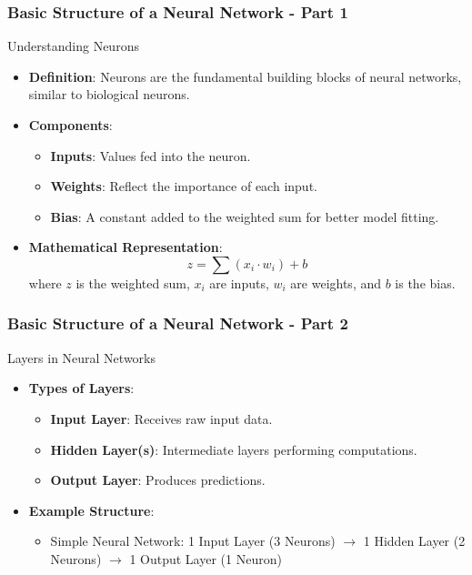 \documentclass[aspectratio=169]{beamer}
\begin{document}
\begin{frame}[fragile]
    \frametitle{Basic Structure of a Neural Network - Part 1}
    \begin{block}{Understanding Neurons}
        \begin{itemize}
            \item \textbf{Definition}: Neurons are the fundamental building blocks of neural networks, similar to biological neurons.
            \item \textbf{Components}:
                \begin{itemize}
                    \item \textbf{Inputs}: Values fed into the neuron.
                    \item \textbf{Weights}: Reflect the importance of each input.
                    \item \textbf{Bias}: A constant added to the weighted sum for better model fitting.
                \end{itemize}
            \item \textbf{Mathematical Representation}:
                \begin{equation}
                    z = \sum (x_i \cdot w_i) + b
                \end{equation}
                where \( z \) is the weighted sum, \( x_i \) are inputs, \( w_i \) are weights, and \( b \) is the bias.
        \end{itemize}
    \end{block}
\end{frame}

\begin{frame}[fragile]
    \frametitle{Basic Structure of a Neural Network - Part 2}
    \begin{block}{Layers in Neural Networks}
        \begin{itemize}
            \item \textbf{Types of Layers}:
                \begin{itemize}
                    \item \textbf{Input Layer}: Receives raw input data.
                    \item \textbf{Hidden Layer(s)}: Intermediate layers performing computations.
                    \item \textbf{Output Layer}: Produces predictions.
                \end{itemize}
            \item \textbf{Example Structure}:
                \begin{itemize}
                    \item Simple Neural Network: 
                    1 Input Layer (3 Neurons) $\rightarrow$ 1 Hidden Layer (2 Neurons) $\rightarrow$ 1 Output Layer (1 Neuron)
                \end{itemize}
        \end{itemize}
    \end{block}
\end{frame}
\end{document}
